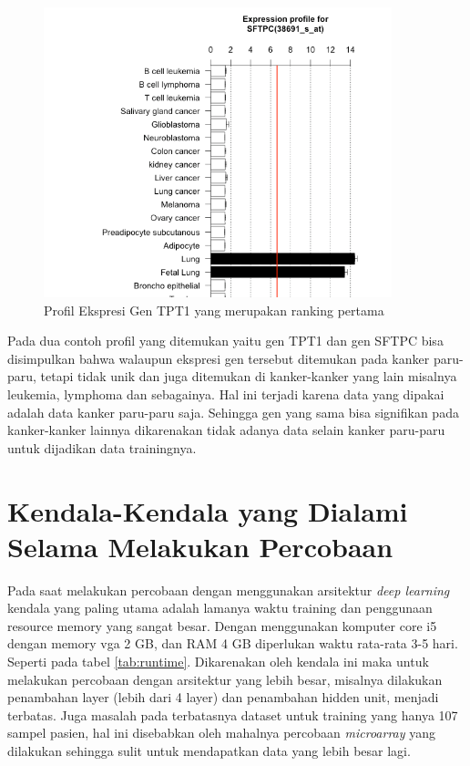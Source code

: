 \begin{figure}
	\centering
	\includegraphics[width=0.9\textwidth]
		{pics/38691_s_at_profil.png}
	\caption{Profil Ekspresi Gen TPT1 yang merupakan ranking pertama}
	\label{fig:SFTPC}
\end{figure}

Pada dua contoh profil yang ditemukan yaitu gen TPT1 dan gen SFTPC bisa disimpulkan bahwa walaupun ekspresi gen tersebut ditemukan pada kanker paru-paru, tetapi tidak unik dan juga ditemukan di kanker-kanker yang lain misalnya leukemia, lymphoma dan sebagainya. Hal ini terjadi karena data yang dipakai adalah data kanker paru-paru saja. Sehingga gen yang sama bisa signifikan pada kanker-kanker lainnya dikarenakan tidak adanya data selain kanker paru-paru untuk dijadikan data trainingnya.
\section{Kendala-Kendala yang Dialami Selama Melakukan Percobaan}
Pada saat melakukan percobaan dengan menggunakan arsitektur \textit{deep learning} kendala yang paling utama adalah lamanya waktu training dan penggunaan resource memory yang sangat besar. Dengan menggunakan komputer core i5 dengan memory vga 2 GB, dan RAM 4 GB diperlukan waktu rata-rata 3-5 hari. Seperti pada tabel \ref{tab:runtime}. Dikarenakan oleh kendala ini maka untuk melakukan percobaan dengan arsitektur yang lebih besar, misalnya dilakukan penambahan layer (lebih dari 4 layer) dan penambahan hidden unit, menjadi terbatas. Juga masalah pada terbatasnya dataset untuk training yang hanya 107 sampel pasien, hal ini disebabkan oleh mahalnya percobaan \textit{microarray} yang dilakukan sehingga sulit untuk mendapatkan data yang lebih besar lagi.

